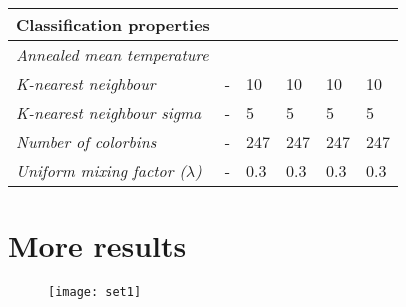 \begin{table}[h]
\begin{tabular}{|l|l|l|l|l|l|}
		\multicolumn{6}{|l|}{\textbf{Classification properties}} \\ \hline  
		\textit{Annealed mean temperature} &                                                                   &                                                                   &                                                                   &                                                                                          &                                                                                \\ \hline
		\textit{K-nearest neighbour}       & -                                                                 & 10                                                                & 10                                                                & 10                                                                                       & 10                                                                             \\ \hline
		\textit{K-nearest neighbour sigma} & -                                                                 & 5                                                                 & 5                                                                 & 5                                                                                        & 5                                                                              \\ \hline
		\textit{Number of colorbins} & -                                                                 & 247                                                                 & 247                                                                 & 247                                                                                        & 247                                                                              \\ \hline
		\textit{Uniform mixing factor ($\lambda$)} & -                                                                 & 0.3                                                                 & 0.3                                                                 & 0.3                                                                                        & 0.3                                                                              \\ \hline
	\end{tabular}
\end{table}

\newpage
\section{More results}\label{ap:more_results}
\begin{figure}[h]
	\centering
	\texttt{[image: set1]}
	\label{fig:moreresults}
\end{figure}

\newpage

